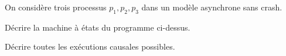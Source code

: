
\begingroup

\begin{exercice}
  
  On considère trois processus $p_1,p_2,p_3$ dans un modèle asynchrone sans crash.
    
  \begin{minipage}[t]{.24\textwidth}
    \begin{algorithm}[H]
    \end{algorithm}
  \end{minipage}%
  \begin{minipage}[t]{.37\textwidth}
    \begin{algorithm}[H]
      \setcounter{AlgoLine}{2}
    \end{algorithm}
  \end{minipage}%
  \begin{minipage}[t]{.37\textwidth}
    \begin{algorithm}[H]
      \setcounter{AlgoLine}{4}
    \end{algorithm}
  \end{minipage}

  \begin{questions}
  \item Décrire la machine à états du programme ci-dessus. 
  \end{questions}

  \begin{questions}
  \item Décrire toutes les exécutions causales possibles. 
  \end{questions}

\end{exercice}

\endgroup
\endinput

